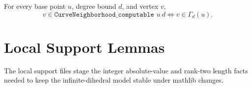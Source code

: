 \begin{theorem}\label{computable_curve_nbhd_iff}
  \leanok
  For every base point $u$, degree bound $d$, and vertex $v$,
  \[
    v\in\texttt{CurveNeighborhood\_computable }u\ d
    \iff
    v\in\Gamma_d(u).
  \]
\end{theorem}

\chapter{Local Support Lemmas}

\begin{lemma}\label{local_mathlib_api}
  \leanok
  The local support files stage the integer absolute-value and rank-two length
  facts needed to keep the infinite-dihedral model stable under mathlib changes.
\end{lemma}